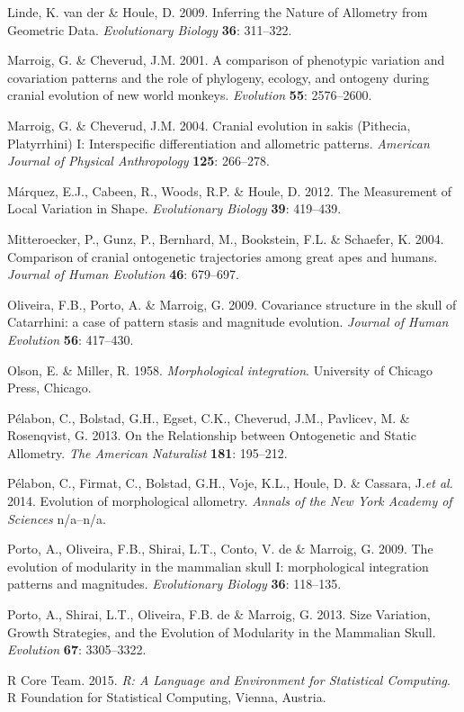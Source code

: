 \documentclass[12pt,]{article}
\begin{document}
Linde, K. van der \& Houle, D. 2009. Inferring the Nature of Allometry
from Geometric Data. \emph{Evolutionary Biology} \textbf{36}: 311--322.

Marroig, G. \& Cheverud, J.M. 2001. A comparison of phenotypic variation
and covariation patterns and the role of phylogeny, ecology, and
ontogeny during cranial evolution of new world monkeys. \emph{Evolution}
\textbf{55}: 2576--2600.

Marroig, G. \& Cheverud, J.M. 2004. Cranial evolution in sakis
(Pithecia, Platyrrhini) I: Interspecific differentiation and allometric
patterns. \emph{American Journal of Physical Anthropology} \textbf{125}:
266--278.

Márquez, E.J., Cabeen, R., Woods, R.P. \& Houle, D. 2012. The
Measurement of Local Variation in Shape. \emph{Evolutionary Biology}
\textbf{39}: 419--439.

Mitteroecker, P., Gunz, P., Bernhard, M., Bookstein, F.L. \& Schaefer,
K. 2004. Comparison of cranial ontogenetic trajectories among great apes
and humans. \emph{Journal of Human Evolution} \textbf{46}: 679--697.

Oliveira, F.B., Porto, A. \& Marroig, G. 2009. Covariance structure in
the skull of Catarrhini: a case of pattern stasis and magnitude
evolution. \emph{Journal of Human Evolution} \textbf{56}: 417--430.

Olson, E. \& Miller, R. 1958. \emph{Morphological integration}.
University of Chicago Press, Chicago.

Pélabon, C., Bolstad, G.H., Egset, C.K., Cheverud, J.M., Pavlicev, M. \&
Rosenqvist, G. 2013. On the Relationship between Ontogenetic and Static
Allometry. \emph{The American Naturalist} \textbf{181}: 195--212.

Pélabon, C., Firmat, C., Bolstad, G.H., Voje, K.L., Houle, D. \&
Cassara, J.\emph{et al.} 2014. Evolution of morphological allometry.
\emph{Annals of the New York Academy of Sciences} n/a--n/a.

Porto, A., Oliveira, F.B., Shirai, L.T., Conto, V. de \& Marroig, G.
2009. The evolution of modularity in the mammalian skull I:
morphological integration patterns and magnitudes. \emph{Evolutionary
Biology} \textbf{36}: 118--135.

Porto, A., Shirai, L.T., Oliveira, F.B. de \& Marroig, G. 2013. Size
Variation, Growth Strategies, and the Evolution of Modularity in the
Mammalian Skull. \emph{Evolution} \textbf{67}: 3305--3322.

R Core Team. 2015. \emph{R: A Language and Environment for Statistical
Computing}. R Foundation for Statistical Computing, Vienna, Austria.
\end{document}
